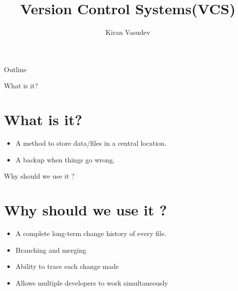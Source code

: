 \documentclass{beamer}
\title{Version Control Systems(VCS)}
\author{Kiran Vasudev\inst{1}}
\institute[Universities of Somewhere and Elsewhere] 
{
  \inst{1}
  Hochschule Bonn-Rhein-Sieg

}
\begin{document}
\begin{frame}
  \titlepage
\end{frame}

\begin{frame}{Outline}
  \tableofcontents
\end{frame}

\begin{frame}{What is it?}
\section{What is it?}
  \begin{itemize}
  \item {
    A method to store data/files in a central location.
  }
  \item {
    A backup when things go wrong.
  }
  \end{itemize}
\end{frame}

\begin{frame}{Why should we use it ?}
\section{Why should we use it ?}
  \begin{itemize}
  \item {
    A complete long-term change history of every file.
  }
  \item {   
    Branching and merging
  }
  \item {   
    Ability to trace each change made
  }
  \item {   
	Allows multiple developers to work simultaneously
  }
  \end{itemize}
\end{frame}
\end{document}
